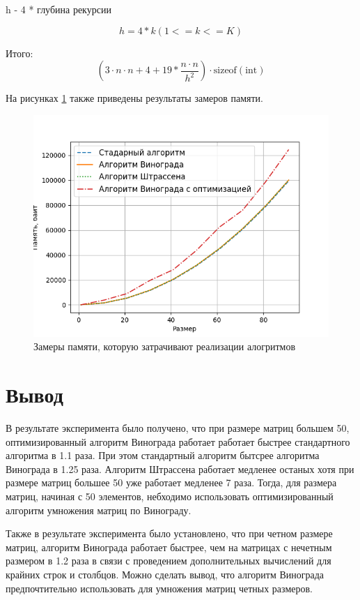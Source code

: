 h - 4 * глубина рекурсии

\begin{equation}
	h = 4 * k (1<= k <= K)
\end{equation}

Итого:
\begin{equation}
	\label{eq:strassen}
	(3 \cdot n \cdot n + 4 + 19 * \dfrac{n \cdot n }{{h}^2}) \cdot \text{sizeof}(\text{int})
\end{equation}


На рисунках \ref{img:mem} также приведены результаты замеров памяти. 

\begin{figure}[H]
	\begin{center}
		\includegraphics[scale=0.7]{img/mem.png}
	\end{center}
	\captionsetup{justification=centering}
	\caption{Замеры памяти, которую затрачивают реализации алогритмов}
	\label{img:mem}
\end{figure}
\section{Вывод}

В результате эксперимента было получено, что при размере матриц большем 50, оптимизированный алгоритм Винограда работает работает быстрее стандартного алгоритма в 1.1 раза. При этом стандартный алгоритм бытсрее алгоритма Винограда в 1.25 раза. Алгоритм Штрассена работает медленее останых хотя при размере матриц большее 50 уже работает медленее 7 раза. Тогда, для размера матриц, начиная с 50 элементов, небходимо использовать оптимизированный алгоритм умножения матриц по Винограду.

Также в результате эксперимента было установлено, что при четном размере матриц, алгоритм Винограда работает быстрее, чем на матрицах с нечетным размером в 1.2 раза в связи с проведением дополнительных вычислений для крайних строк и столбцов. Можно сделать вывод, что алгоритм Винограда предпочтительно использовать для умножения матриц четных размеров.